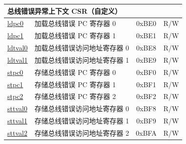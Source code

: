 \begin{longtable}{ | p{4.0cm} | p{8.4cm} | c | l | }
\multicolumn{4}{|l|}{\textbf{总线错误异常上下文 CSR（自定义）}} \\\hline
\hyperref[regdesc:LDPC0]{ldpc0} & 加载总线错误 PC 寄存器 0 & 0xBE0 & R/W \\\hline
\hyperref[regdesc:LDPC1]{ldpc1} & 加载总线错误 PC 寄存器 1 & 0xBE1 & R/W \\\hline
\hyperref[regdesc:LDTVAL0]{ldtval0} & 加载总线错误访问地址寄存器 0 & 0xBE8 & R/W \\\hline
\hyperref[regdesc:LDTVAL1]{ldtval1} & 加载总线错误访问地址寄存器 1 & 0xBE9 & R/W \\\hline
\hyperref[regdesc:STPC0]{stpc0} & 存储总线错误 PC 寄存器 0 & 0xBF0 & R/W \\\hline
\hyperref[regdesc:STPC1]{stpc1} & 存储总线错误 PC 寄存器 1 & 0xBF1 & R/W \\\hline
\hyperref[regdesc:STPC2]{stpc2} & 存储总线错误 PC 寄存器 2 & 0xBF2 & R/W \\\hline
\hyperref[regdesc:STTVAL0]{sttval0} & 存储总线错误访问地址寄存器 0 & 0xBF8 & R/W \\\hline
\hyperref[regdesc:STTVAL1]{sttval1} & 存储总线错误访问地址寄存器 1 & 0xBF9 & R/W \\\hline
\hyperref[regdesc:STTVAL2]{sttval2} & 存储总线错误访问地址寄存器 2 & 0xBFA & R/W \\\hline

\end{longtable}
